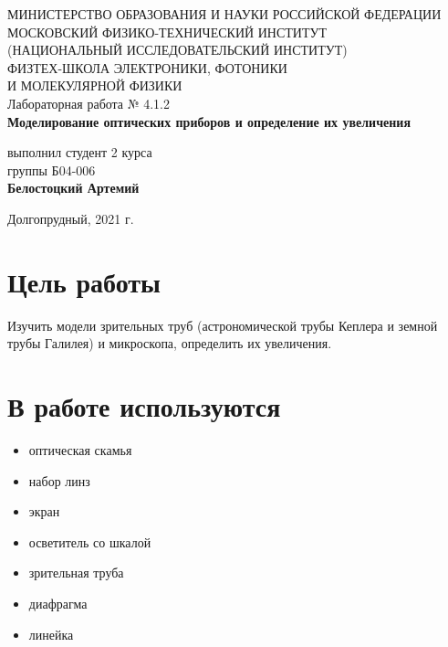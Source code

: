 \documentclass[a4paper,12pt]{article}
\begin{document}
 

\begin{titlepage}
	\begin{center}
		\large 	МИНИСТЕРСТВО ОБРАЗОВАНИЯ И НАУКИ РОССИЙСКОЙ ФЕДЕРАЦИИ\\
				МОСКОВСКИЙ ФИЗИКО-ТЕХНИЧЕСКИЙ ИНСТИТУТ \\
				(НАЦИОНАЛЬНЫЙ ИССЛЕДОВАТЕЛЬСКИЙ ИНСТИТУТ)\\ 
				ФИЗТЕХ-ШКОЛА ЭЛЕКТРОНИКИ, ФОТОНИКИ \\
				И МОЛЕКУЛЯРНОЙ ФИЗИКИ \\
		
		
		\vspace{4.0 cm}
		Лабораторная работа № 4.1.2 \\ 
		\LARGE \textbf{Моделирование оптических приборов и определение их увеличения}
	\end{center}
	\vspace{3 cm} \large
	
	\begin{flushright}
		выполнил студент 2 курса \\
		{группы Б04-006}\\
		\textbf{Белостоцкий Артемий}\\
	\end{flushright}
	
	\vfill

	\begin{center}
	Долгопрудный, 2021 г.
	\end{center}
\end{titlepage}                                                                      


\section*{Цель работы}
Изучить модели зрительных труб (астрономической трубы Кеплера и земной трубы Галилея) и микроскопа, определить их увеличения.

\section*{В работе используются}

\begin{itemize}
\item оптическая скамья
\item набор линз
\item экран 
\item осветитель со шкалой
\item зрительная труба 
\item диафрагма 
\item линейка
\end{itemize}
\end{document}
